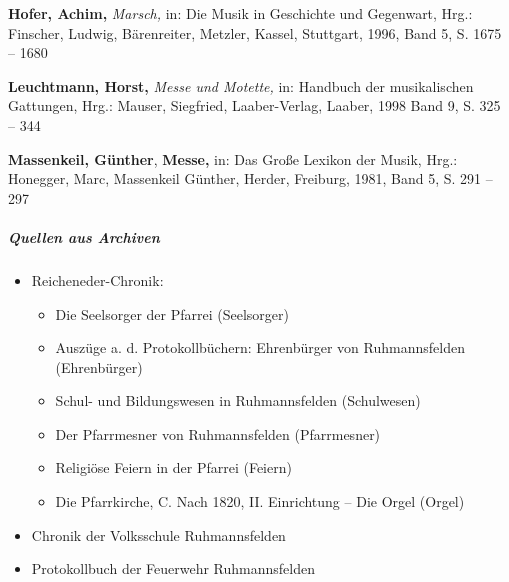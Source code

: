 \textbf{Hofer, Achim, }\textit{Marsch,} in: Die Musik in Geschichte und
Gegenwart, Hrg.: Finscher, Ludwig, Bärenreiter, Metzler, Kassel,
Stuttgart, 1996, Band 5, S. 1675 – 1680

\textbf{Leuchtmann, Horst,} \textit{Messe und Motette,} in: Handbuch der
musikalischen Gattungen, Hrg.: Mauser, Siegfried, Laaber-Verlag,
Laaber, 1998 Band 9, S. 325 – 344

\textbf{Massenkeil, Günther}, \textbf{Messe,} in: Das Große Lexikon der
Musik, Hrg.: Honegger, Marc, Massenkeil Günther, Herder, Freiburg,
1981, Band 5, S. 291 – 297

\subparagraph{Quellen aus Archiven}

\begin{itemize}
\item Reicheneder-Chronik:

\begin{itemize}
\item Die Seelsorger der Pfarrei (Seelsorger)

\item Auszüge a. d. Protokollbüchern: Ehrenbürger von Ruhmannsfelden
(Ehrenbürger)

\item Schul- und Bildungswesen in Ruhmannsfelden (Schulwesen)

\item Der Pfarrmesner von Ruhmannsfelden (Pfarrmesner)

\item Religiöse Feiern in der Pfarrei (Feiern)

\item Die Pfarrkirche, C. Nach 1820, II. Einrichtung – Die Orgel (Orgel)
\end{itemize}

\item Chronik der Volksschule Ruhmannsfelden

\item Protokollbuch der Feuerwehr Ruhmannsfelden
\end{itemize}